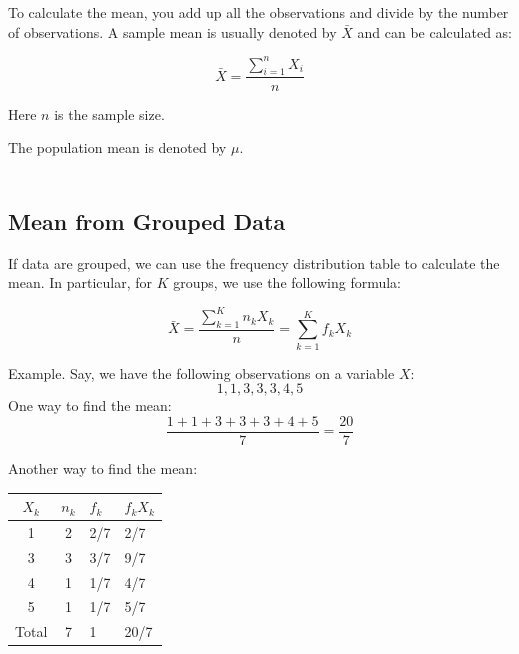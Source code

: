 \documentclass{./../../Latex/handout}
\begin{document}
To calculate the mean, you add up all the observations and divide by the number of observations. A sample mean is usually denoted by $\bar{X}$ and can be calculated as:

$$ \bar{X} = \frac {\sum_{i=1}^n X_i}{n} $$ 

Here $n$ is the sample size. 

The population mean is denoted by $\mu$. \\

 \\ 

\subsection*{Mean from Grouped Data}

If data are grouped, we can use the frequency distribution table to calculate the mean.  In particular, for $K$ groups, we use the following formula: 

$$ \bar{X} = \frac{\sum_{k=1}^K n_k X_k}{n} = \sum_{k=1}^K f_k X_k $$

 Example. Say, we have the following observations on a variable $X$:  $$1,1,3,3,3,4,5$$ One way to find the mean:
 $$ \frac{1+1+3+3+3+4+5}{7} = \frac{20}{7}  $$
 
 Another way to find the mean:
 \begin{center}
\begin{tabular}{|c|c|p{1cm}|p{1cm}|}
\hline
$X_k$ & \hspace{0.5em} $n_k$ & \hspace{0.2em} $f_k$ & $f_k X_k$ \\
\hline
 1 & 2 & 2/7 & 2/7 \\
 \hline
3 &  3 & 3/7 & 9/7 \\
\hline
4 & 1 & 1/7 & 4/7 \\
\hline
5 &  1 & 1/7 & 5/7  \\
\hline
Total & 7 & 1 & 20/7 \\
\hline
\end{tabular}
 \end{center}
 
\end{document}
